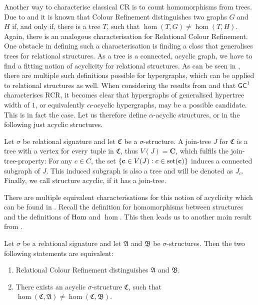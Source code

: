 Another way to characterise classical CR is to count homomorphisms from trees.
Due to \cite{dvorak2010RecognizingGraphsa} and \cite{dell2018LovaszMeets} it is known that Colour Refinement distinguishes two graphs $G$ and $H$ if, and only if, there is a tree $T$, such that $\hom(T,G)\neq\hom(T,H)$.
Again, there is an analogous characterisation for Relational Colour Refinement.
One obstacle in defining such a characterisation is finding a class that generalises trees for relational structures.
As a tree is a connected, acyclic graph, we have to find a fitting notion of acyclicity for relational structures.
As can be seen in \cite{brault-baron2014HypergraphAcyclicity}, there are multiple such definitions possible for hypergraphs, which can be applied to relational structures as well.
When considering the results from \cite{scheidt2023CountingHomomorphisms} and that $\mathsf{GC}^1$ characterises RCR, it becomes clear that hypergraphs of generalised hypertree width of $1$, or equivalently $\alpha$-acyclic hypergraphs, may be a possible candidate.
This is in fact the case.
Let us therefore define $\alpha$-acyclic structures, or in the following just acyclic structures.

\begin{definition}
	\label{def:alphaAcyclic}
	Let $\sigma$ be relational signature and let $\mathfrak C$ be a $\sigma$-structure.
	A join-tree $J$ for $\mathfrak C$ is a tree with a vertex for every tuple in $\mathfrak C$, thus $V(J)=\mathbf C$, which fulfils the join-tree-property:
	For any $c\in C$, the set $\{\mathbf c \in V(J) : c\in \operatorname{set}(\mathbf c)\}$ induces a connected subgraph of $J$.
	This induced subgraph is also a tree and will be denoted as $J_c$.
	Finally, we call structure acyclic, if it has a join-tree.
\end{definition}
There are multiple equivalent characterisations for this notion of acyclicity which can be found in \cite{brault-baron2014HypergraphAcyclicity}.
Recall the definition for homomorphisms between structures and the definitions of $\operatorname{Hom}$ and $\hom$.
This then leads us to another main result from \cite{scheidt2025ColorRefinement}.

\begin{theorem}
	Let $\sigma$ be a relational signature and let $\mathfrak A$ and $\mathfrak B$ be $\sigma$-structures.
	Then the two following statements are equivalent:
	\begin{enumerate}
		\item Relational Colour Refinement distinguishes $\mathfrak A$ and $\mathfrak B$.
		\item There exists an acyclic $\sigma$-structure $\mathfrak C$, such that $\hom(\mathfrak C,\mathfrak A)\neq\hom(\mathfrak C,\mathfrak B)$.
	\end{enumerate}
\end{theorem}

